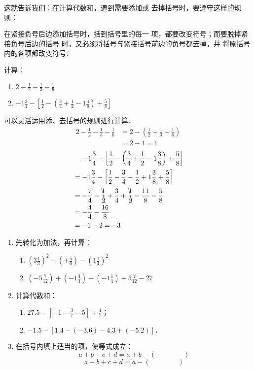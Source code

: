 这就告诉我们：在计算代数和，遇到需要添加或
去掉括号时，要遵守这样的规则：

\begin{blk}{}
	在紧接负号后边添加括号时，括到括号里的每一
	项，都要改变符号；而要脱掉紧接负号后边的括号
	时，又必须将括号与紧接括号前边的负号都去掉，并
	将原括号内的各项都改变符号．
\end{blk}



\begin{example}
	计算：
	\begin{enumerate}
		\item $2-\frac{1}{2}-\frac{1}{3}-\frac{1}{6}$
		\item $-1\frac{3}{4}-\left[\frac{1}{2}-\left(\frac{3}{4}+\frac{1}{2}-1\frac{3}{8}\right)+\frac{5}{8}\right]$
	\end{enumerate}
\end{example}

\begin{solution}
	可以灵活运用添、去括号的规则进行计算．
	\[ \begin{split}
	2-\frac{1}{2}-\frac{1}{3}-\frac{1}{6}&=2-\left(\frac{1}{2}+\frac{1}{3}+\frac{1}{6}\right)\\
	&=2-1=1
	\end{split}  \]
	\[ \begin{split}
	&\quad -1\frac{3}{4}-\left[\frac{1}{2}-\left(\frac{3}{4}+\frac{1}{2}-1\frac{3}{8}\right)+\frac{5}{8}\right]\\
	&=-1\frac{3}{4}-\left[\frac{1}{2}-\frac{3}{4}-\frac{1}{2}+1\frac{3}{8}+\frac{5}{8}\right]\\
	&=-\frac{7}{4}-\bcancel{\frac{1}{2}}+\frac{3}{4}+\bcancel{\frac{1}{2}}-\frac{11}{8}-\frac{5}{8}\\
	&=-\frac{4}{4}-\frac{16}{8}\\
	&=-1-2=-3
	\end{split}  \]
\end{solution}

\begin{ex}
	\begin{enumerate}
		\item 先转化为加法，再计算：
		\begin{enumerate}
			\item $\left(3\frac{1}{3}\right)^2-\left(+\frac{5}{6}\right)-\left(1\frac{1}{4}\right)^2$
			\item $\left(-5\frac{7}{12}\right)+\left(-1\frac{3}{4}\right)-\left(-1\frac{1}{4}\right)+5\frac{7}{12}-27$
		\end{enumerate}
		\item 计算代数和：
		\begin{enumerate}
			\item $27.5-\left[-1-\frac{3}{7}-5\right]+\frac{4}{7}$；
			\item $-1.5-[1.4-(-3.6)-4.3+(-5.2)]$．
		\end{enumerate}
		\item 在括号内填上适当的项，使等式成立：
		\[a+b-c+d=a+b-(\qquad \qquad )\]
		\[ a-b+c+d=a-(\qquad \qquad )     \]
	\end{enumerate}    
\end{ex}

